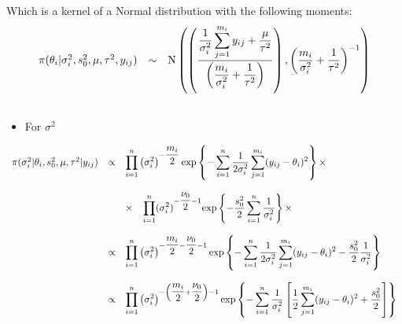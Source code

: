 \documentclass[a4paper, 11pt]{article}
\begin{document}
Which is a kernel of a Normal distribution with the following moments:\\
\begin{equation*}
\begin{array}{lcl ll }

\pi(\theta_i| \sigma_i^2, s_0^2, \mu, \tau^2, y_{ij}) & \sim &  \mbox{N} \left(  \left( \dfrac{\dfrac{1}{\sigma_i^2}\displaystyle\sum_{j=1}^{m_i}y_{ij} + \dfrac{\mu}{\tau^2}}{ \left( \dfrac{m_i}{\sigma_i^2} + \dfrac{1}{\tau^2} \right)} \right), \left(\dfrac{m_i}{\sigma_i^2} + \dfrac{1}{\tau^2} \right)^{-1} \right) \\\\

 \end{array}
\end{equation*}


\begin{itemize}
\item For $\sigma^2$
\end{itemize}
\begin{equation*}
\begin{array}{lcl ll }

\pi(\sigma_i^2|\theta_i, s_0^2, \mu, \tau^2 |y_{ij}) & \propto & \displaystyle\prod_{i=1}^{n}\left(\sigma_i^2\right)^{-\dfrac{m_i}{2}}\mbox{exp}\left\{ - \displaystyle\sum_{i=1}^{n}\dfrac{1}{2\sigma_i^2}\displaystyle\sum_{j=1}^{m_i}(y_{ij} - \theta_i)^2\right\} \times \\ \\

& & \times \hspace{0.3cm}\displaystyle\prod_{i=1}^{n}(\sigma_i^2)^{-\dfrac{\nu_0}{2}-1} \mbox{exp}\left\{ - \dfrac{s_0^2}{2}\displaystyle\sum_{i=1}^{n}\dfrac{1}{\sigma_i^2}\right\} \times \\ \\

& \propto & \displaystyle\prod_{i=1}^{n}\left(\sigma_i^2\right)^{-\dfrac{m_i}{2}-\dfrac{\nu_0}{2}-1}\mbox{exp}\left\{ - \displaystyle\sum_{i=1}^{n}\dfrac{1}{2\sigma_i^2}\displaystyle\sum_{j=1}^{m_i}(y_{ij} - \theta_i)^2 - \dfrac{s_0^2}{2}\dfrac{1}{\sigma_i^2}\right\} \\ \\

& \propto & \displaystyle\prod_{i=1}^{n}\left(\sigma_i^2\right)^{-\left(\dfrac{m_i}{2}+\dfrac{\nu_0}{2}\right)-1}\mbox{exp}\left\{ - \displaystyle\sum_{i=1}^{n}\dfrac{1}{\sigma_i^2}\left[\dfrac{1}{2}\displaystyle\sum_{j=1}^{m_i}(y_{ij} - \theta_i)^2 + \dfrac{s_0^2}{2}\right]\right\} \\ \\
 \end{array}
\end{equation*}
\end{document}
